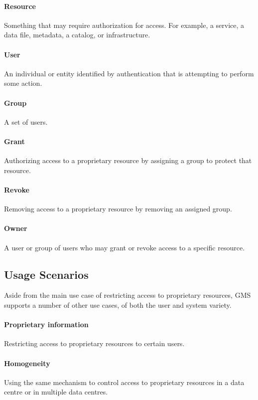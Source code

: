 \documentclass[11pt,a4paper]{ivoa}
\begin{document}
\paragraph{Resource} Something that may require authorization for access.  For example, a service, a data file, metadata, a catalog, or infrastructure.

\paragraph{User} An individual or entity identified by authentication that is attempting to perform some action.

\paragraph{Group} A set of users.

\paragraph{Grant} Authorizing access to a proprietary resource by assigning a group to protect that resource.

\paragraph{Revoke} Removing access to a proprietary resource by removing an assigned group.

\paragraph{Owner} A user or group of users who may grant or revoke access to a specific resource.

\subsection{Usage Scenarios}
\label{subsec:usecases}

Aside from the main use case of restricting access to proprietary resources, GMS supports a number of other use cases, of both the user and system variety.

\paragraph{Proprietary information} Restricting access to proprietary resources to certain users.

\paragraph{Homogeneity} Using the same mechanism to control access to proprietary resources in a data centre or in multiple data centres.
\end{document}
